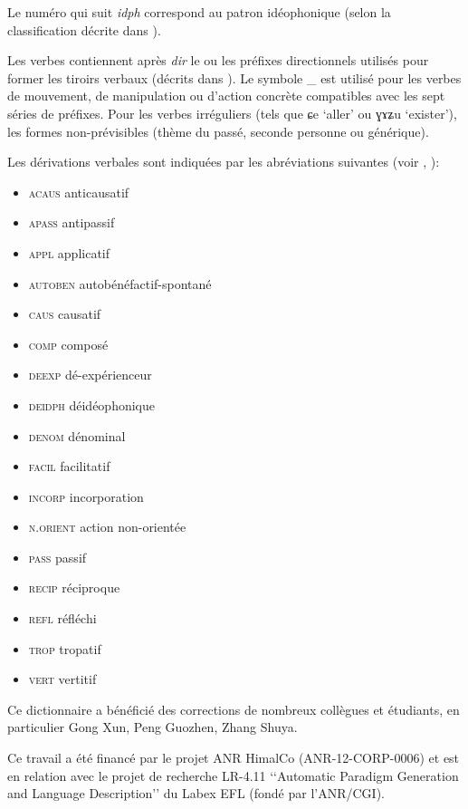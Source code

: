 \documentclass[oldfontcommands,oneside,a4paper,11pt]{article}
\newcommand{\ipa}[1]{{\phon #1}} %
\begin{document}
Le numéro qui suit \textit{idph} correspond au patron idéophonique (selon la classification décrite dans \citealt{japhug14ideophones}).

Les verbes contiennent après \textit{dir} le ou les préfixes directionnels utilisés pour former les tiroirs verbaux (décrits dans \citealt[267-9]{jacques14linking}). Le symbole \_  est utilisé pour les verbes de mouvement, de manipulation ou d'action concrète compatibles avec les sept séries de préfixes. Pour les verbes irréguliers (tels que \ipa{ɕe} `aller' ou \ipa{ɣɤʑu}  `exister'), les formes non-prévisibles (thème du passé, seconde personne ou générique). 

Les dérivations verbales sont indiquées par les abréviations suivantes (voir \citealt{jacques12incorp, jacques13tropative, jacques14antipassive,  jacques15spontaneous}, \citeyear{jacques15causative, jacques16relatives}):

\begin{itemize}
\item \textsc{acaus} anticausatif 
\item \textsc{apass} antipassif
\item \textsc{appl} applicatif
\item \textsc{autoben} autobénéfactif-spontané
\item \textsc{caus} causatif 
\item \textsc{comp} composé
\item \textsc{deexp} dé-expérienceur
\item \textsc{deidph} déidéophonique
\item \textsc{denom} dénominal
\item \textsc{facil} facilitatif
\item \textsc{incorp} incorporation
\item \textsc{n.orient} action non-orientée
\item \textsc{pass} passif
\item \textsc{recip} réciproque
\item \textsc{refl} réfléchi
\item \textsc{trop} tropatif
\item \textsc{vert} vertitif
\end{itemize}

Ce dictionnaire a bénéficié des corrections de nombreux collègues et étudiants, en particulier Gong Xun, Peng Guozhen, Zhang Shuya.

Ce travail a été financé par le projet ANR HimalCo  (ANR-12-CORP-0006) et est en relation avec le projet de recherche LR-4.11 ‘‘Automatic Paradigm Generation and Language Description’’ du Labex EFL (fondé par l'ANR/CGI).
\end{document}
